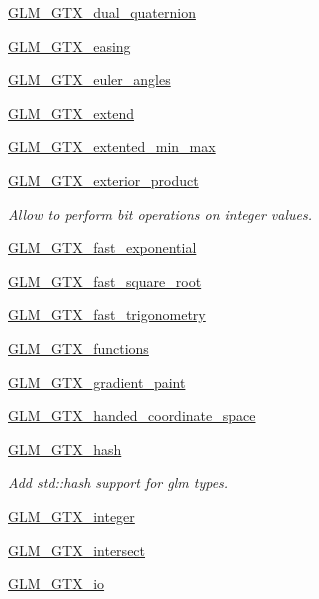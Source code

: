 \begin{DoxyCompactItemize}
\item 
\mbox{\hyperlink{group__gtx__dual__quaternion}{G\+L\+M\+\_\+\+G\+T\+X\+\_\+dual\+\_\+quaternion}}
\item 
\mbox{\hyperlink{group__gtx__easing}{G\+L\+M\+\_\+\+G\+T\+X\+\_\+easing}}
\item 
\mbox{\hyperlink{group__gtx__euler__angles}{G\+L\+M\+\_\+\+G\+T\+X\+\_\+euler\+\_\+angles}}
\item 
\mbox{\hyperlink{group__gtx__extend}{G\+L\+M\+\_\+\+G\+T\+X\+\_\+extend}}
\item 
\mbox{\hyperlink{group__gtx__extended__min__max}{G\+L\+M\+\_\+\+G\+T\+X\+\_\+extented\+\_\+min\+\_\+max}}
\item 
\mbox{\hyperlink{group__gtx__exterior__product}{G\+L\+M\+\_\+\+G\+T\+X\+\_\+exterior\+\_\+product}}
\begin{DoxyCompactList}\small\item\em Allow to perform bit operations on integer values. \end{DoxyCompactList}\item 
\mbox{\hyperlink{group__gtx__fast__exponential}{G\+L\+M\+\_\+\+G\+T\+X\+\_\+fast\+\_\+exponential}}
\item 
\mbox{\hyperlink{group__gtx__fast__square__root}{G\+L\+M\+\_\+\+G\+T\+X\+\_\+fast\+\_\+square\+\_\+root}}
\item 
\mbox{\hyperlink{group__gtx__fast__trigonometry}{G\+L\+M\+\_\+\+G\+T\+X\+\_\+fast\+\_\+trigonometry}}
\item 
\mbox{\hyperlink{group__gtx__functions}{G\+L\+M\+\_\+\+G\+T\+X\+\_\+functions}}
\item 
\mbox{\hyperlink{group__gtx__gradient__paint}{G\+L\+M\+\_\+\+G\+T\+X\+\_\+gradient\+\_\+paint}}
\item 
\mbox{\hyperlink{group__gtx__handed__coordinate__space}{G\+L\+M\+\_\+\+G\+T\+X\+\_\+handed\+\_\+coordinate\+\_\+space}}
\item 
\mbox{\hyperlink{group__gtx__hash}{G\+L\+M\+\_\+\+G\+T\+X\+\_\+hash}}
\begin{DoxyCompactList}\small\item\em Add std\+::hash support for glm types. \end{DoxyCompactList}\item 
\mbox{\hyperlink{group__gtx__integer}{G\+L\+M\+\_\+\+G\+T\+X\+\_\+integer}}
\item 
\mbox{\hyperlink{group__gtx__intersect}{G\+L\+M\+\_\+\+G\+T\+X\+\_\+intersect}}
\item 
\mbox{\hyperlink{group__gtx__io}{G\+L\+M\+\_\+\+G\+T\+X\+\_\+io}}

\end{DoxyCompactItemize}
